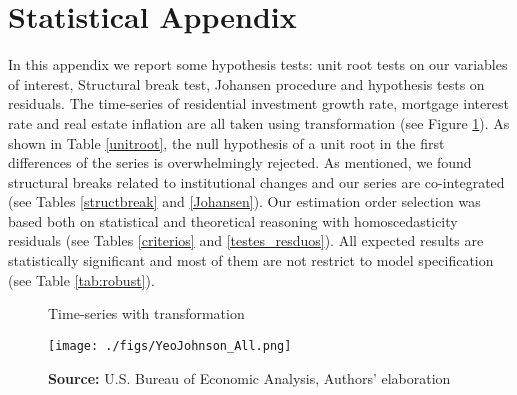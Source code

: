 \documentclass[12pt, a4paper]{article}
\begin{document}
\appendix
\section{Statistical Appendix}
\label{sec:org8fc336f}
\label{appen:A}

In this appendix we report some hypothesis tests: unit root tests on our variables of interest, Structural break test, Johansen procedure and hypothesis tests on residuals.
The time-series of residential investment growth rate, mortgage interest rate and real estate inflation are all taken using \textcite{yeo_new_2000} transformation (see Figure \ref{YeoJhonson}).
As shown in Table \ref{unitroot}, the null hypothesis of a unit root in the first differences of the series is overwhelmingly rejected.
As mentioned, we found structural breaks related to institutional changes and our series are co-integrated (see Tables \ref{structbreak} and \ref{Johansen}).
Our estimation order selection was based both on statistical and theoretical reasoning with homoscedasticity residuals (see Tables \ref{criterios} and \ref{testes_resduos}).
All expected results are statistically significant and most of them are not restrict to model specification (see Table \ref{tab:robust}).

\begin{figure}[htb]
	\centering
	\caption{Time-series with \textcite{yeo_new_2000} transformation}
	\label{YeoJhonson}
	\texttt{[image: ./figs/YeoJohnson\_All.png]}
	\caption*{\textbf{Source:} U.S. Bureau of Economic Analysis, Authors' elaboration}
\end{figure}






\end{document}
